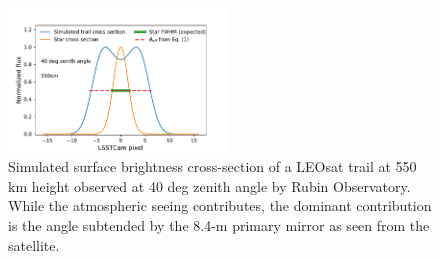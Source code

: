 \documentclass[twocolumn,trackchanges]{aastex63}
\begin{document}
\begin{figure}[ht]
\includegraphics[trim=+1cm 0 0 0, width=0.52\textwidth]{sat_profile_1.pdf}
\caption{Simulated surface brightness cross-section of a LEOsat trail at 550 km height observed at 40 deg zenith angle by Rubin Observatory. While the atmospheric seeing contributes, the dominant contribution is the angle subtended by the 8.4-m primary mirror as seen from the satellite.  \label{fig:LSSTxsection}}
\end{figure}
\end{document}
